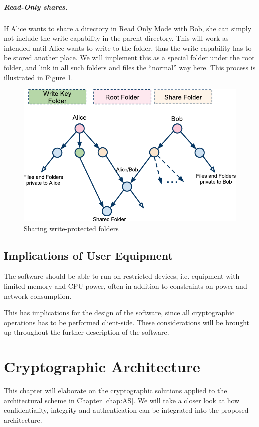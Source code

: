 \documentclass[pdftex,english,10pt,b5paper,twoside]{book}
\begin{document}
\paragraph{Read-Only shares.}

If Alice wants to share a directory in Read Only Mode with Bob, she can simply
not include the write capability in the parent directory. This will work as
intended until Alice wants to write to the folder, thus the write capability has to
be stored another place. We will implement this as a special folder under the
root folder, and link in all such folders and files the ``normal'' way here.
This process is illustrated in Figure \ref{fig:AS:readonly}.

\begin{figure}[h!]
    \centering
    \includegraphics[width=\columnwidth]{ArchitectureShareReadOnlyFolder.pdf}
    \caption{Sharing write-protected folders}
    \label{fig:AS:readonly}
\end{figure}

\section{Implications of User Equipment}

The software should be able to run on restricted devices, i.e. equipment with
limited memory and \ac{CPU} power, often in addition to constraints on power and
network consumption.

This has implications for the design of the software, since all cryptographic
operations has to be performed client-side. These considerations will be
brought up throughout the further description of the software.

\chapter{Cryptographic Architecture}
\label{chap:CS}
This chapter will elaborate on the cryptographic solutions applied to the
architectural scheme in Chapter \ref{chap:AS}. We will take a closer look at
how confidentiality, integrity and authentication can be integrated into the
proposed architecture.
\end{document}
